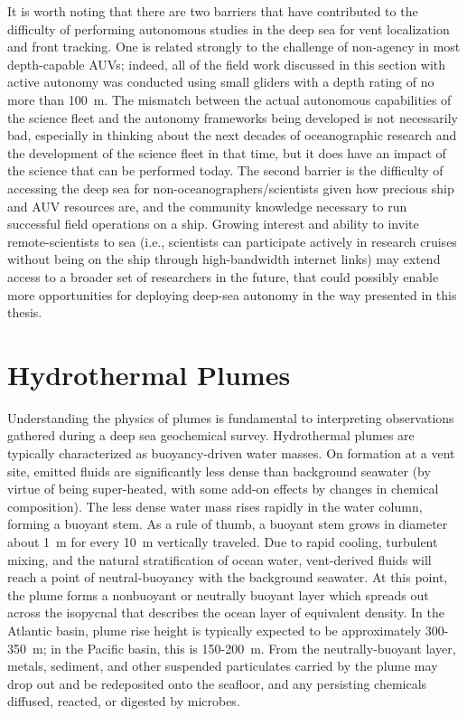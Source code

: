 It is worth noting that there are two barriers that have contributed to the difficulty of performing autonomous studies in the deep sea for vent localization and front tracking. One is related strongly to the challenge of non-agency in most depth-capable AUVs; indeed, all of the field work discussed in this section with active autonomy was conducted using small gliders with a depth rating of no more than \SI{100}{\meter}. The mismatch between the actual autonomous capabilities of the science fleet and the autonomy frameworks being developed is not necessarily bad, especially in thinking about the next decades of oceanographic research and the development of the science fleet in that time, but it does have an impact of the science that can be performed today. The second barrier is the difficulty of accessing the deep sea for non-oceanographers/scientists given how precious ship and AUV resources are, and the community knowledge necessary to run successful field operations on a ship. Growing interest and ability to invite remote-scientists to sea (i.e., scientists can participate actively in research cruises without being on the ship through high-bandwidth internet links) may extend access to a broader set of researchers in the future, that could possibly enable more opportunities for deploying deep-sea autonomy in the way presented in this thesis.  


\section{Hydrothermal Plumes}
\label{sec:rw_plumes}
Understanding the physics of plumes is fundamental to interpreting observations gathered during a deep sea geochemical survey. Hydrothermal plumes are typically characterized as buoyancy-driven water masses. On formation at a vent site, emitted fluids are significantly less dense than background seawater (by virtue of being super-heated, with some add-on effects by changes in chemical composition). The less dense water mass rises rapidly in the water column, forming a buoyant stem. As a rule of thumb, a buoyant stem grows in diameter about \SI{1}{\meter} for every \SI{10}{\meter} vertically traveled. Due to rapid cooling, turbulent mixing, and the natural stratification of ocean water, vent-derived fluids will reach a point of neutral-buoyancy with the background seawater. At this point, the plume forms a nonbuoyant or neutrally buoyant layer which spreads out across the isopycnal that describes the ocean layer of equivalent density. In the Atlantic basin, plume rise height is typically expected to be approximately 300-\SI{350}{\meter}; in the Pacific basin, this is 150-\SI{200}{\meter}\autocite{speer1989model}. From the neutrally-buoyant layer, metals, sediment, and other suspended particulates carried by the plume may drop out and be redeposited onto the seafloor, and any persisting chemicals diffused, reacted, or digested by microbes\autocite{scholz2019shelf,dick2013microbiology}.

